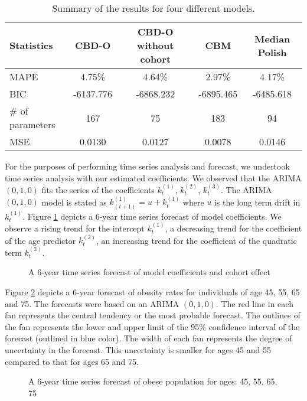 \documentclass[11pt,letterpaper]{article}
\numberwithin{equation}{section}
\begin{document}
\begin{table}[]
\centering
\caption{Summary of the results for four different models.}
\label{mixtures}
\begin{tabular}{lcccc}
\hline\hline
Statistics & CBD-O & CBD-O without cohort & CBM & Median Polish \\
\hline
MAPE  & 4.75\%	& 4.64\%  & 2.97\%& 4.17\%  \\
BIC & -6137.776 &   -6868.232 & -6895.465 &-6485.618\\
\# of parameters &167 & 75 & 183 & 94\\
MSE & 0.0130 &  0.0127 & 0.0078 & 0.0146\\
\hline\hline
\end{tabular}
\end{table}

For the purposes of performing time series analysis and forecast, we undertook time series analysis with our estimated coefficients. We observed that the ARIMA $(0,1,0)$ fits the series of the coefficients $k_t^{(1)}$, $k_t^{(2)}$, $k_t^{(3)}$. The ARIMA $(0,1,0)$ model is stated as $k_{(t+1)}^{(1)}= u + k_t^{(1)}$ where $u$ is the long term drift in $k_t^{(1)}$. Figure \ref{fig:f10}  depicts a 6-year time series forecast of model coefficients. We observe a rising trend for the intercept $k_t^{(1)}$, a decreasing trend for the coefficient of the age predictor $k_t^{(2)}$, an increasing trend for the coefficient of the quadratic term $k_t^{(3)}$.

\begin{figure}
\begin{center}
{}
\caption{\label{fig:f10} A 6-year time series forecast of model coefficients and cohort effect}
\end{center}
\end{figure}

Figure \ref{fig:f11} depicts a 6-year forecast of obesity rates for individuals of age 45, 55, 65 and 75. The forecasts were based on an ARIMA $(0, 1,0)$. The red line in each fan represents the central tendency or the most probable forecast. The outlines of the fan represents the lower and upper limit of the 95\% confidence interval of the forecast (outlined in blue color). The width of each fan represents the degree of uncertainty in the forecast. This uncertainty is smaller for ages 45 and 55 compared to that for ages 65 and 75.

\begin{figure}
\begin{center}
{}
\caption{\label{fig:f11} A 6-year time series forecast of obese population for ages: 45, 55, 65, 75}
\end{center}
\end{figure}
\end{document}
